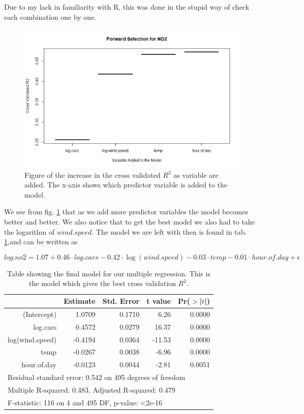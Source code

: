 \documentclass[a4paper,norsk, 10pt]{article}
\begin{document}
Due to my lack in familiarity with R, this was done in the stupid way of check each combination one by one. 


\begin{figure}[!htbp]
\centering
\includegraphics[scale=0.5]{r2_forward.png}
\caption{Figure of the increase in the cross validated $R^2$ as variable are added. The x-axis shows which predictor variable is added to the model.}\label{fig:r2}
\end{figure}


We see from fig. \ref{fig:r2} that as we add more predictor variables the model becomes better and better. We also notice that to get the best model we also had to take the logarithm of $wind.speed$. The model we are left with then is found in tab. \ref{tab:r2},and can be written as

\begin{equation}\label{eq:full}
log.no2 = 1.07 + 0.46\cdot log.cars - 0.42\cdot \log(wind.speed) - 0.03\cdot temp - 0.01 \cdot hour.of.day + \epsilon
\end{equation}

\begin{table}[ht]
\centering
\begin{tabular}{rrrrr}
  \hline
 & Estimate & Std. Error & t value & Pr($>$|$t$|) \\ 
  \hline
(Intercept) & 1.0709 & 0.1710 & 6.26 & 0.0000 \\ 
  log.cars & 0.4572 & 0.0279 & 16.37 & 0.0000 \\ 
  log(wind.speed) & -0.4194 & 0.0364 & -11.53 & 0.0000 \\ 
  temp & -0.0267 & 0.0038 & -6.96 & 0.0000 \\ 
  hour.of.day & -0.0123 & 0.0044 & -2.81 & 0.0051 \\ 
   \hline
      \multicolumn{5}{l}{Residual standard error: 0.542 on 495 degrees of freedom} \\
   \multicolumn{5}{l}{Multiple R-squared:  0.483,	Adjusted R-squared:  0.479 } \\
   \multicolumn{5}{l}{F-statistic:  116 on 4 and 495 DF,  p-value: <2e-16} \\ \hline
\end{tabular}
\caption{Table showing the final model for our multiple regression. This is the model which gives the best cross validation $R^2$.}\label{tab:r2}
\end{table}
\end{document}
